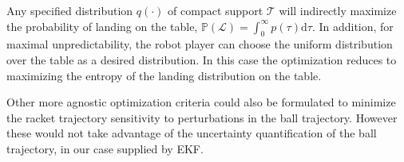 \documentclass[letterpaper, 10 pt, conference]{ieeeconf}
\newcommand{\court}{\mathcal{T}} %
\newcommand{\prob}{\mathbb{P}} %
\newcommand{\landTime}{\tau} %
\newcommand{\landEvent}{\mathcal{L}} %
\newcommand{\landDist}{p(\tau)} %
\begin{document}
Any specified distribution $q(\cdot)$ of compact support $\court$ will indirectly maximize the probability of landing on the table, $\prob(\landEvent) = \int_{0}^{\infty}\landDist\textrm{d}\landTime$. In addition, for maximal unpredictability, the robot player can choose the uniform distribution over the table as a desired distribution. In this case the optimization reduces to maximizing the entropy of the landing distribution on the table. 

Other more agnostic optimization criteria could also be formulated to minimize the racket trajectory sensitivity to perturbations in the ball trajectory. However these would not take advantage of the uncertainty quantification of the ball trajectory, in our case supplied by EKF.
\end{document}
